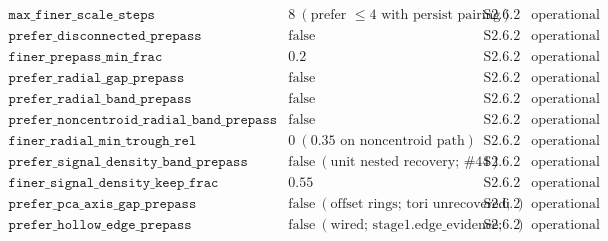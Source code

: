 \documentclass[11pt]{article}
\begin{document}
\[\begin{array}{llll}
\texttt{max\_finer\_scale\_steps} & 8\ (\text{prefer }\le4\text{ with persist pairing}) & \text{S2.6.2} & \text{operational (proposal-path)}\\
\texttt{prefer\_disconnected\_prepass} & \text{false} & \text{S2.6.2} & \text{operational (proposal-path)}\\
\texttt{finer\_prepass\_min\_frac} & 0.2 & \text{S2.6.2} & \text{operational (proposal-path)}\\
\texttt{prefer\_radial\_gap\_prepass} & \text{false} & \text{S2.6.2} & \text{operational (proposal-path)}\\
\texttt{prefer\_radial\_band\_prepass} & \text{false} & \text{S2.6.2} & \text{operational (proposal-path)}\\
\texttt{prefer\_noncentroid\_radial\_band\_prepass} & \text{false} & \text{S2.6.2} & \text{operational (proposal-path)}\\
\texttt{finer\_radial\_min\_trough\_rel} & 0\ (\text{0.35 on noncentroid path}) & \text{S2.6.2} & \text{operational (proposal-path)}\\
\texttt{prefer\_signal\_density\_band\_prepass} & \text{false}\ (\text{unit nested recovery; \#44}) & \text{S2.6.2} & \text{operational (proposal-path)}\\
\texttt{finer\_signal\_density\_keep\_frac} & 0.55 & \text{S2.6.2} & \text{operational (proposal-path)}\\
\texttt{prefer\_pca\_axis\_gap\_prepass} & \text{false}\ (\text{offset rings; tori unrecovered; \#44}) & \text{S2.6.2} & \text{operational (proposal-path)}\\
\texttt{prefer\_hollow\_edge\_prepass} & \text{false}\ (\text{wired; stage1.edge\_evidence; \#44}) & \text{S2.6.2} & \text{operational (proposal-path)}\\

\end{array}\]
\end{document}
